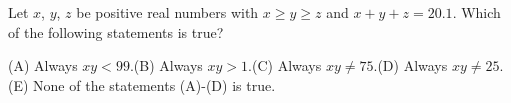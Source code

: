 Let $x$, $y$, $z$ be positive real numbers with $x\ge y\ge z$ and $x+y+z=20.1$. Which of the following statements is true?

(A) Always $xy<99$.\quad (B) Always $xy>1$.\quad (C) Always $xy\ne75$.\quad (D) Always $xy\ne25$.\quad (E) None of the statements (A)-(D) is true.
